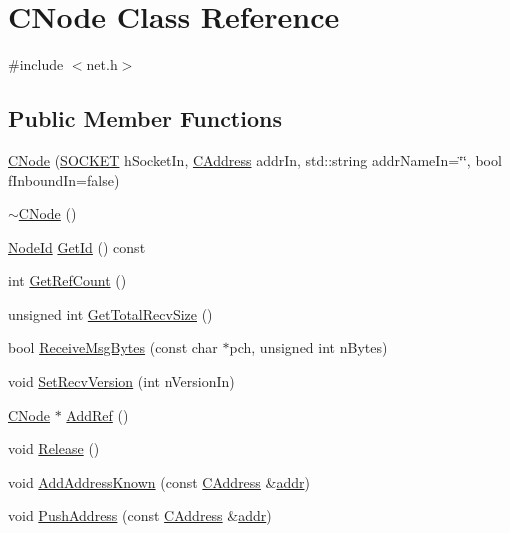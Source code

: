 \hypertarget{class_c_node}{}\section{C\+Node Class Reference}
\label{class_c_node}


{\ttfamily \#include $<$net.\+h$>$}

\subsection*{Public Member Functions}
\begin{DoxyCompactItemize}
\item 
\hyperlink{class_c_node_a51556705550511146245b9fb2fec09c1}{C\+Node} (\hyperlink{compat_8h_a26ef1173e2f2c0d3db27eca28397d723}{S\+O\+C\+K\+E\+T} h\+Socket\+In, \hyperlink{class_c_address}{C\+Address} addr\+In, std\+::string addr\+Name\+In=\char`\"{}\char`\"{}, bool f\+Inbound\+In=false)
\item 
\hyperlink{class_c_node_ac9b30cb93e91a48dacc58821abfc44f0}{$\sim$\+C\+Node} ()
\item 
\hyperlink{net_8h_a954d746a58632565552615fd0a4ee660}{Node\+Id} \hyperlink{class_c_node_ac0f1a22fa938e84138536308e2001340}{Get\+Id} () const 
\item 
int \hyperlink{class_c_node_a72211aaf51af2e981e6b8a1deb73c836}{Get\+Ref\+Count} ()
\item 
unsigned int \hyperlink{class_c_node_a2cff79a034258ba032257e993fc42e62}{Get\+Total\+Recv\+Size} ()
\item 
bool \hyperlink{class_c_node_a84a10eb3aec7fdddafeb354527b50b75}{Receive\+Msg\+Bytes} (const char $\ast$pch, unsigned int n\+Bytes)
\item 
void \hyperlink{class_c_node_a94438c6285d1635c62ccff10593780e6}{Set\+Recv\+Version} (int n\+Version\+In)
\item 
\hyperlink{class_c_node}{C\+Node} $\ast$ \hyperlink{class_c_node_afb65ed679f7bda59aab89e0f5afae292}{Add\+Ref} ()
\item 
void \hyperlink{class_c_node_af804bf7c7f9794e80a3b916e1befece9}{Release} ()
\item 
void \hyperlink{class_c_node_a1d2cecdd03c9da642d292f6a81ac6ed8}{Add\+Address\+Known} (const \hyperlink{class_c_address}{C\+Address} \&\hyperlink{class_c_node_a3993ecb1de2a2135a3cf0904346a6f88}{addr})
\item 
void \hyperlink{class_c_node_a06950a5ce265a1d4df1aad7f28e6fde8}{Push\+Address} (const \hyperlink{class_c_address}{C\+Address} \&\hyperlink{class_c_node_a3993ecb1de2a2135a3cf0904346a6f88}{addr})

\end{DoxyCompactItemize}
